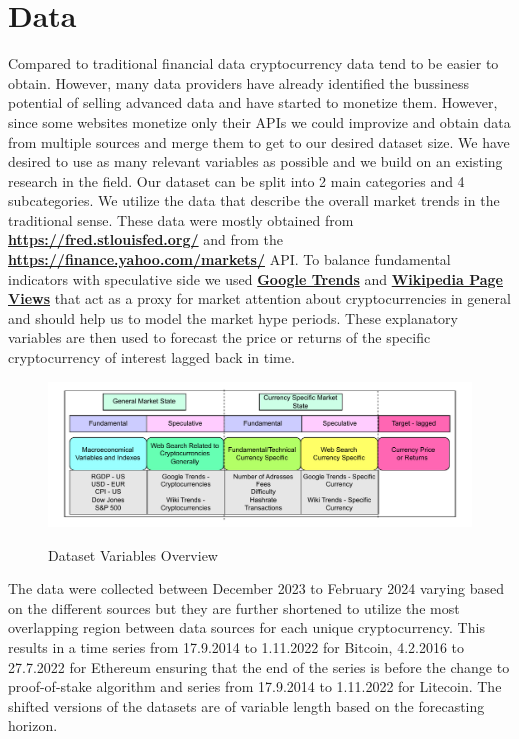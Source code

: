 \chapter{Data}
\label{chap:three}

Compared to traditional financial data cryptocurrency data tend to be easier
to obtain. However, many data providers have already identified the bussiness 
potential of selling advanced data and have started to monetize them. However,
since some
websites monetize only their APIs we could improvize and obtain data from 
multiple sources and merge them to get to our desired dataset size. We have
desired to use as many relevant variables as possible and we build on
an existing research in the field.
Our dataset can be split into 2 main categories and 4 subcategories.
We utilize the data that describe the overall market trends in the traditional
sense. These data were mostly obtained from \textbf{\href{https://fred.stlouisfed.org/}{https://fred.stlouisfed.org/}}
and from the 
\textbf{\href{https://finance.yahoo.com/markets/}{https://finance.yahoo.com/markets/}} API.
To balance fundamental indicators with speculative side we used \textbf{\href{https://trends.google.com/trends/}{Google Trends}}
and \textbf{\href{https://pageviews.wmcloud.org/}{Wikipedia Page Views}} 
that act as a proxy for market attention about cryptocurrencies in general 
and should help us to model the market hype periods. These explanatory
variables are then used to forecast the price or returns of the specific cryptocurrency
of interest lagged back in time.

\begin{figure}[!h]
    \centering
    \caption{Dataset Variables Overview}
        \includegraphics[width=1\textwidth]{Figures/dataset_description.drawio.pdf}
    \label{fig:dataset_description}
\end{figure}


The data were collected between December 2023 to February 2024 varying 
based on
the different sources but they are further shortened to utilize the most
overlapping region between data sources for each unique cryptocurrency.
This results in a time series from 17.9.2014 to 1.11.2022 for Bitcoin, 4.2.2016
to 27.7.2022 for Ethereum ensuring that the end of the series is 
before the change to proof-of-stake algorithm and series from 17.9.2014 to 1.11.2022
for Litecoin. The shifted versions of the datasets are of variable length based
on the forecasting horizon. 
